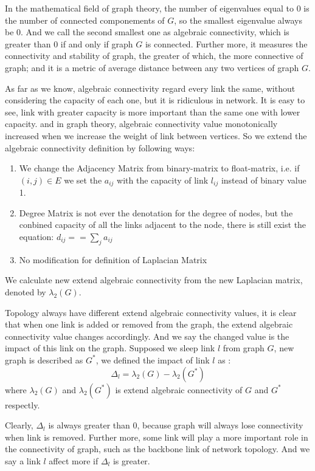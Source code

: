 \documentclass[conference]{IEEEtran}
\begin{document}
In the mathematical field of graph theory, the number of eigenvalues equal to 0 is the number of connected 
componements of $G$, so the smallest eigenvalue always be 0. And we call the second smallest one as
algebraic connectivity, which is greater than 0 if and only if graph $G$ is connected. Further more,  
it measures the connectivity and stability of graph, the greater of which, the more connective of graph;
and it is a metric of average distance between any two vertices of graph $G$.


As far as we know, 
algebraic connectivity regard every link the same, without considering the capacity of each one, but it is 
ridiculous in network. It is easy to see, link with greater capacity is more important than the same one
with lower capacity. and in graph theory, algebraic connectivity value monotonically increased when we
increase the weight of link between vertices. So we extend the algebraic connectivity definition by following ways:

\begin{enumerate}
	\item We change the Adjacency Matrix from binary-matrix to float-matrix, i.e. if $(i,j) \in E$ we set the $a_{ij}$
with the capacity of link $l_{ij}$ instead of binary value 1.
	\item Degree Matrix is not ever the denotation for the degree of nodes, but the conbined capacity of all the links
adjacent to the node, there is still exist the equation: $d_{ij} == \sum_{j} a_{ij}$
	\item No modification for definition of Laplacian Matrix
\end{enumerate}


We calculate new extend algebraic connectivity from the new Laplacian matrix, denoted by $\lambda_2(G)$.


Topology always have different extend algebraic connectivity values, it is clear that when one link is added or 
removed from the graph, the extend algebraic connectivity value changes accordingly. And we say the changed value
is the impact of this link on the graph. Supposed we sleep link $l$ from graph $G$, new graph is described as $G^*$, 
we defined the impact of link $l$ as :
\begin{equation}
	\Delta_l = \lambda_2(G) - \lambda_2(G^*)
\end{equation}
where $\lambda_2(G)$ and $\lambda_2(G^*)$ is extend algebraic connectivity of $G$ and $G^*$ respectly.


Clearly, $\Delta_l$ is always greater than 0, because graph will always lose connectivity when link is removed.
Further more, some link will play a more important role in the connectivity of graph, such as the backbone link 
of network topology. And we say a link $l$ affect more if $\Delta_l$ is greater.
\end{document}
